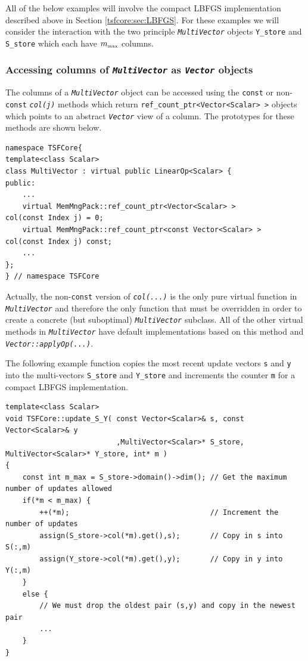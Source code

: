 All of the below examples will involve the compact LBFGS
implementation described above in Section \ref{tsfcore:sec:LBFGS}.  For
these examples we will consider the interaction with the two principle
\texttt{\textit{Multi\-Vector}} objects \texttt{Y\_store} and
\texttt{S\_store} which each have $m_{\tiny\mbox{max}}$ columns.

%
\subsubsection{Accessing columns of \texttt{\textit{Multi\-Vector}}
as \texttt{\textit{Vector}} objects}
%

The columns of a \texttt{\textit{Multi\-Vector}} object can be accessed
using the \texttt{const} or non-\texttt{const}
\texttt{\textit{col(j)}} methods which return
\texttt{ref\_count\_ptr<Vector<Scalar> >} objects which points to an abstract
\texttt{\textit{Vector}} view of a column.  The prototypes for these
methods are shown below.

{\tiny\begin{verbatim}
namespace TSFCore{
template<class Scalar>
class MultiVector : virtual public LinearOp<Scalar> {
public:
    ...
    virtual MemMngPack::ref_count_ptr<Vector<Scalar> >        col(const Index j) = 0;
    virtual MemMngPack::ref_count_ptr<const Vector<Scalar> >  col(const Index j) const;
    ...
};
} // namespace TSFCore
\end{verbatim}}

Actually, the non-\texttt{const} version of \texttt{\textit{col(...)}}
is the only pure virtual function in \texttt{\textit{Multi\-Vector}} and
therefore the only function that must be overridden in order to create
a concrete (but suboptimal) \texttt{\textit{Multi\-Vector}} subclass.
All of the other virtual methods in \texttt{\textit{Multi\-Vector}} have
default implementations based on this method and
\texttt{\textit{Vector\-::applyOp(\-...)}}.

The following example function copies the most recent update vectors
\texttt{s} and \texttt{y} into the multi-vectors \texttt{S\_store}
and \texttt{Y\_store} and increments the counter \texttt{m} for a
compact LBFGS implementation.

{\tiny\begin{verbatim}
template<class Scalar>
void TSFCore::update_S_Y( const Vector<Scalar>& s, const Vector<Scalar>& y
                          ,MultiVector<Scalar>* S_store, MultiVector<Scalar>* Y_store, int* m )
{
    const int m_max = S_store->domain()->dim(); // Get the maximum number of updates allowed
    if(*m < m_max) {
        ++(*m);                                 // Increment the number of updates
        assign(S_store->col(*m).get(),s);       // Copy in s into S(:,m)         
        assign(Y_store->col(*m).get(),y);       // Copy in y into Y(:,m)
    }
    else {
        // We must drop the oldest pair (s,y) and copy in the newest pair
        ...
    }
}
\end{verbatim}}

